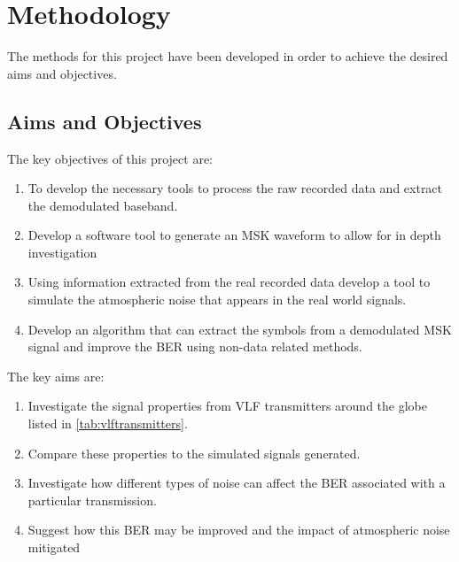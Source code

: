 \chapter{Methodology}
The methods for this project have been developed in order to achieve the desired aims and objectives.

\section{Aims and Objectives}

The key objectives of this project are:

\begin{enumerate}
    \item To develop the necessary tools to process the raw recorded data and extract the demodulated baseband.
    \item Develop a software tool to generate an MSK waveform to allow for in depth investigation
    \item Using information extracted from the real recorded data develop a tool to simulate the atmospheric noise that appears in the real world signals.
    \item Develop an algorithm that can extract the symbols from a demodulated MSK signal and improve the BER using non-data related methods.
\end{enumerate}

The key aims are:

\begin{enumerate}
    \item Investigate the signal properties from VLF transmitters around the globe listed in \ref{tab:vlftransmitters}. 
    \item Compare these properties to the simulated signals generated.
    \item Investigate how different types of noise can affect the BER associated with a particular transmission.
    \item Suggest how this BER may be improved and the impact of atmospheric noise mitigated
\end{enumerate}
